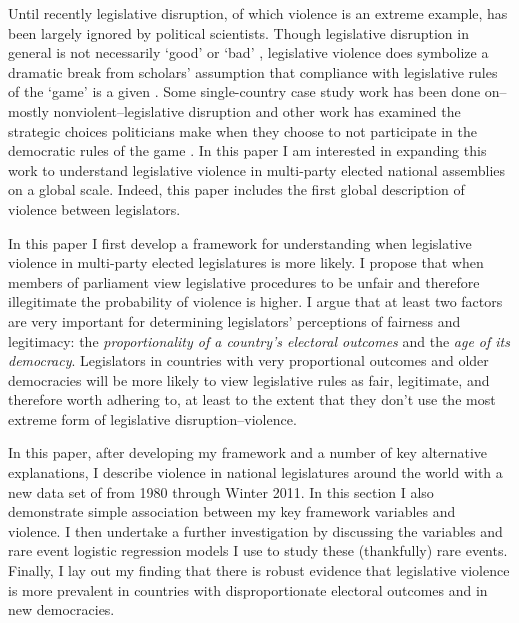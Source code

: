 \documentclass[a4paper]{article}\usepackage{graphicx, color}
\begin{document}
Until recently legislative disruption, of which violence is an extreme example, has been largely ignored by political scientists. Though legislative disruption in general is not necessarily `good' or `bad' \citep[see][for discussions of how disruption may be a `safety valve' in contexts where dissent is strongly curtailed]{Ostrow1996,Young2002}, legislative violence does symbolize a dramatic break from scholars' assumption that compliance with legislative rules of the `game' is a given \cite{Wolfe2004}. Some single-country case study work has been done on--mostly nonviolent--legislative disruption \cite[see][]{Armitage2013,Johnson2013,Ilie2013,Wolfe2004} and other work has examined the strategic choices politicians make when they choose to not participate in the democratic rules of the game \citep[e.g.][on election boycotts]{Beaulieu2008}. In this paper I am interested in expanding this work to understand legislative violence in multi-party elected national assemblies on a global scale. Indeed, this paper includes the first global description of violence between legislators. 

In this paper I first develop a framework for understanding when legislative violence in multi-party elected legislatures is more likely. I propose that when members of parliament view legislative procedures to be unfair and therefore illegitimate the probability of violence is higher. I argue that at least two factors are very important for determining legislators' perceptions of fairness and legitimacy: the \emph{proportionality of a country's electoral outcomes} and the \emph{age of its democracy}. Legislators in countries with very proportional outcomes and older democracies will be more likely to view legislative rules as fair, legitimate, and therefore worth adhering to, at least to the extent that they don't use the most extreme form of legislative disruption--violence. 

In this paper, after developing my framework and a number of key alternative explanations, I describe violence in national legislatures around the world with a new data set of from 1980 through Winter 2011. In this section I also demonstrate simple association between my key framework variables and violence. I then undertake a further investigation by discussing the variables and rare event logistic regression models \citep{KingRareEvents2001, KingRareEventsPA2001} I use to study these (thankfully) rare events. Finally, I lay out my finding that there is robust evidence that legislative violence is more prevalent in countries with disproportionate electoral outcomes and in new democracies. 
\end{document}
